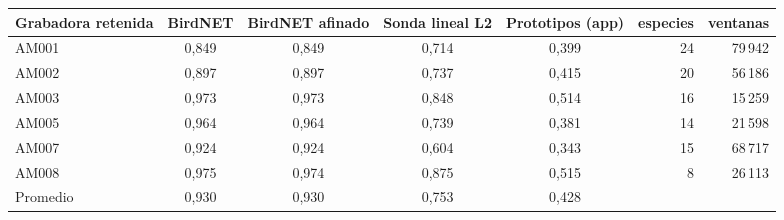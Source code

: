 \begin{tabular}{lccccrr}
\toprule
Grabadora retenida & BirdNET & BirdNET afinado & Sonda lineal L2 & Prototipos (app) & especies & ventanas\\
\midrule
AM001 & 0{,}849 & 0{,}849 & 0{,}714 & 0{,}399 & 24 & 79\,942\\
AM002 & 0{,}897 & 0{,}897 & 0{,}737 & 0{,}415 & 20 & 56\,186\\
AM003 & 0{,}973 & 0{,}973 & 0{,}848 & 0{,}514 & 16 & 15\,259\\
AM005 & 0{,}964 & 0{,}964 & 0{,}739 & 0{,}381 & 14 & 21\,598\\
AM007 & 0{,}924 & 0{,}924 & 0{,}604 & 0{,}343 & 15 & 68\,717\\
AM008 & 0{,}975 & 0{,}974 & 0{,}875 & 0{,}515 & 8 & 26\,113\\
\midrule
Promedio & 0{,}930 & 0{,}930 & 0{,}753 & 0{,}428 & & \\
\bottomrule
\end{tabular}
